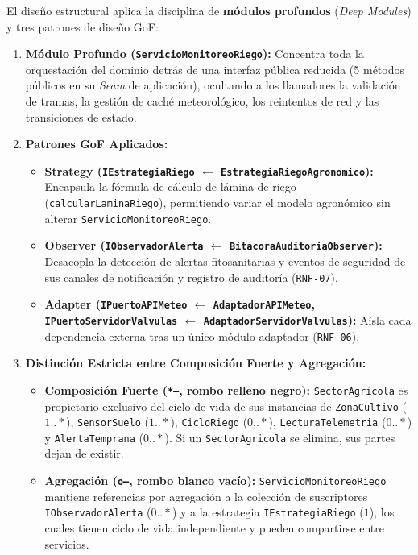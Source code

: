 \documentclass[12pt,letterpaper]{report}
\begin{document}
El diseño estructural aplica la disciplina de \textbf{módulos profundos} (\textit{Deep Modules}) y tres patrones de diseño GoF:
\begin{enumerate}
    \item \textbf{Módulo Profundo (\texttt{ServicioMonitoreoRiego}):} Concentra toda la orquestación del dominio detrás de una interfaz pública reducida (5 métodos públicos en su \textit{Seam} de aplicación), ocultando a los llamadores la validación de tramas, la gestión de caché meteorológico, los reintentos de red y las transiciones de estado.
    \item \textbf{Patrones GoF Aplicados:}
    \begin{itemize}
        \item \textbf{Strategy (\texttt{IEstrategiaRiego} $\leftarrow$ \texttt{EstrategiaRiegoAgronomico}):} Encapsula la fórmula de cálculo de lámina de riego (\texttt{calcularLaminaRiego}), permitiendo variar el modelo agronómico sin alterar \texttt{ServicioMonitoreoRiego}.
        \item \textbf{Observer (\texttt{IObservadorAlerta} $\leftarrow$ \texttt{BitacoraAuditoriaObserver}):} Desacopla la detección de alertas fitosanitarias y eventos de seguridad de sus canales de notificación y registro de auditoría (\texttt{RNF-07}).
        \item \textbf{Adapter (\texttt{IPuertoAPIMeteo} $\leftarrow$ \texttt{AdaptadorAPIMeteo}, \texttt{IPuertoServidorValvulas} $\leftarrow$ \texttt{AdaptadorServidorValvulas}):} Aísla cada dependencia externa tras un único módulo adaptador (\texttt{RNF-06}).
    \end{itemize}
    \item \textbf{Distinción Estricta entre Composición Fuerte y Agregación:}
    \begin{itemize}
        \item \textbf{Composición Fuerte (\texttt{*--}, rombo relleno negro):} \texttt{SectorAgricola} es propietario exclusivo del ciclo de vida de sus instancias de \texttt{ZonaCultivo} ($1..*$), \texttt{SensorSuelo} ($1..*$), \texttt{CicloRiego} ($0..*$), \texttt{LecturaTelemetria} ($0..*$) y \texttt{AlertaTemprana} ($0..*$). Si un \texttt{SectorAgricola} se elimina, sus partes dejan de existir.
        \item \textbf{Agregación (\texttt{o--}, rombo blanco vacío):} \texttt{ServicioMonitoreoRiego} mantiene referencias por agregación a la colección de suscriptores \texttt{IObservadorAlerta} ($0..*$) y a la estrategia \texttt{IEstrategiaRiego} ($1$), los cuales tienen ciclo de vida independiente y pueden compartirse entre servicios.
    \end{itemize}
\end{enumerate}
\end{document}
